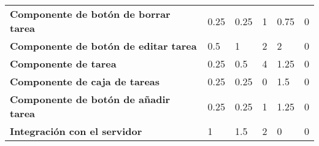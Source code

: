 \begin{table}[]
\begin{adjustbox}{width=\columnwidth,center}
\begin{tabular}{llllll}
{\color[HTML]{000000} \textbf{Componente de botón de borrar tarea}}    & {\color[HTML]{000000} 0.25}                     & {\color[HTML]{000000} 0.25}                     & {\color[HTML]{000000} 1}                            & {\color[HTML]{000000} 0.75}                                 & {\color[HTML]{000000} 0}                                        \\
{\color[HTML]{000000} \textbf{Componente de botón de editar tarea}}    & {\color[HTML]{000000} 0.5}                      & {\color[HTML]{000000} 1}                        & {\color[HTML]{000000} 2}                            & {\color[HTML]{000000} 2}                                    & {\color[HTML]{000000} 0}                                        \\
{\color[HTML]{000000} \textbf{Componente de tarea}}                    & {\color[HTML]{000000} 0.25}                     & {\color[HTML]{000000} 0.5}                      & {\color[HTML]{000000} 4}                            & {\color[HTML]{000000} 1.25}                                 & {\color[HTML]{000000} 0}                                        \\
{\color[HTML]{000000} \textbf{Componente de caja de tareas}}           & {\color[HTML]{000000} 0.25}                     & {\color[HTML]{000000} 0.25}                     & {\color[HTML]{000000} 0}                            & {\color[HTML]{000000} 1.5}                                  & {\color[HTML]{000000} 0}                                        \\
{\color[HTML]{000000} \textbf{Componente de botón de añadir tarea}}    & {\color[HTML]{000000} 0.25}                     & {\color[HTML]{000000} 0.25}                     & {\color[HTML]{000000} 1}                            & {\color[HTML]{000000} 1.25}                                 & {\color[HTML]{000000} 0}                                        \\
{\color[HTML]{000000} \textbf{Integración con el servidor}}            & {\color[HTML]{000000} 1}                        & {\color[HTML]{000000} 1.5}                      & {\color[HTML]{000000} 2}                            & {\color[HTML]{000000} 0}                                    & {\color[HTML]{000000} 0}
\end{tabular}
\end{adjustbox}
\end{table}
